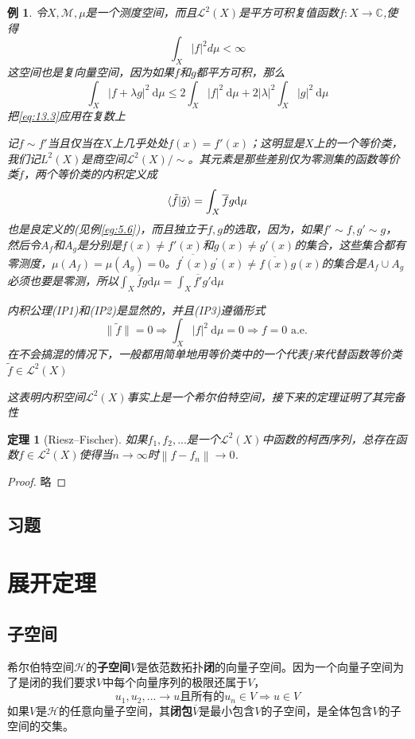 \documentclass[hyperref,UTF8]{ctexbook}
\newtheorem{eg}{例}[chapter]
\newtheorem{theorem}{定理}[chapter]
\begin{document}
\begin{eg}\label{eg:13.4}
    令\(X,\mathcal{M},\mu\)是一个测度空间，而且\(\mathcal{L}^2(X)\)是平方可积复值函数\(f:X\rightarrow\mathbb{C}\),使得
    \[\int_X\left\lvert f\right\rvert^2d\mu<\infty \]
    这空间也是复向量空间，因为如果\(f\)和\(g\)都平方可积，那么
    $$
\int_{X}|f+\lambda g|^{2} \mathrm{~d} \mu \leq 2 \int_{X}|f|^{2} \mathrm{~d} \mu+2|\lambda|^{2} \int_{X}|g|^{2} \mathrm{~d} \mu
$$
把\ref{eq:13.3}应用在复数上

记\(f \sim f'\)当且仅当在\(X\)上几乎处处\(f(x)=f'(x)\)；这明显是\(X\)上的一个等价类，我们记\(L^2(X)\)是商空间\(\mathcal{L}^2(X)/\sim\)。其元素是那些差别仅为零测集的函数等价类\(\tilde{f}\)，两个等价类的内积定义成
\[\braket{\tilde{f}|\tilde{g}}=\int_X \overline{f}g \mathrm{d}\mu\]
也是良定义的(见例\ref{eg:5.6})，而且独立于\(f,g\)的选取，因为，如果\(f'\sim f,g'\sim g\)，然后令\(A_f\)和\(A_g\)是分别是\(f(x)\neq f'(x)\)和\(g(x)\neq g'(x)\)的集合，这些集合都有零测度，\(\mu(A_f)=\mu(A_g)=0\)。\(\overline{f^{\prime}(x)} g^{\prime}(x) \neq \overline{f(x)} g(x)\)的集合是\(A_f\cup A_g\)必须也要是零测，所以\(\int_X \overline{f}g \mathrm{d}\mu=\int_X \overline{f'}g' \mathrm{d}\mu\)

内积公理(IP1)和(IP2)是显然的，并且(IP3)遵循形式
$$
\|\tilde{f}\|=0 \Longrightarrow \int_{X}|f|^{2} \mathrm{~d} \mu=0 \Longrightarrow f=0 \text { a.e. }
$$
在不会搞混的情况下，一般都用简单地用等价类中的一个代表\(f\)来代替函数等价类\(\tilde{f}\in \mathcal{L}^2(X)\)

这表明内积空间\(\mathcal{L}^2(X)\)事实上是一个希尔伯特空间，接下来的定理证明了其完备性
\end{eg}
\begin{theorem}[Riesz–Fischer]
    如果\(f_1,f_2,...\)是一个\(\mathcal{L}^2(X)\)中函数的柯西序列，总存在函数\(f\in \mathcal{L}^2(X)\)使得当\(n\rightarrow\infty\)时\(\left\lVert f-f_n\right\rVert \rightarrow0\).
\end{theorem}
\begin{proof}
    略
\end{proof}
\subsection*{习题}
\section{展开定理}
\subsection{子空间}
希尔伯特空间\(\mathcal{H}\)的\textbf{子空间}\(V\)是依范数拓扑\textbf{闭}的向量子空间。因为一个向量子空间为了是闭的我们要求\(V\)中每个向量序列的极限还属于\(V\)，
\[u_1,u_2,...\rightarrow u\text{且所有的}u_n\in V\Longrightarrow u\in V \]
如果\(V\)是\(\mathcal{H}\)的任意向量子空间，其\textbf{闭包}\(\overline{V}\)是最小包含\(V\)的子空间，是全体包含\(V\)的子空间的交集。
\end{document}
